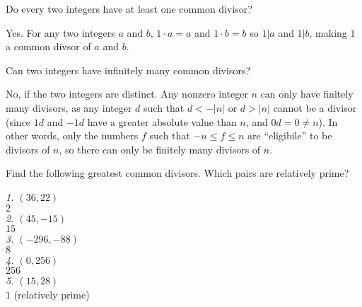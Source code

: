 \documentclass[../main.tex]{subfiles}
\begin{document}
\begin{ques} \label{1.29}
  Do every two integers have at least one common divisor?
\end{ques}

Yes. For any two integers $a$ and $b$, $1 \cdot a = a$ and $1 \cdot b = b$ so $1 | a$ and $1 | b$, making $1$ a common divsor of $a$ and $b$.



\begin{ques} \label{1.30}
  Can two integers have infinitely many common divisors?
\end{ques}

No, if the two integers are distinct. Any nonzero integer $n$ can only have finitely many divisors, as any integer $d$ such that $d < -|n|$ or $d > |n|$ cannot be a divisor (since $1d$ and $-1d$ have a greater absolute value than $n$, and $0d = 0 \neq n$). In other words, only the numbers $f$ such that $-n \leq f \leq n$ are ``eligibile'' to be divisors of $n$, so there can only be finitely many divisors of $n$.



\begin{ex} \label{1.31}
  Find the following greatest common divisors. Which pairs are relatively prime?
\end{ex}

\hspace*{5mm} \emph{1. $(36, 22)$} \\
\hspace*{15mm} $2$ \\

\hspace*{5mm} \emph{2. $(45, -15)$} \\
\hspace*{15mm} $15$ \\

\hspace*{5mm} \emph{3. $(-296, -88)$} \\
\hspace*{15mm} $8$ \\

\hspace*{5mm} \emph{4. $(0, 256)$} \\
\hspace*{15mm} $256$ \\

\hspace*{5mm} \emph{5. $(15, 28)$} \\
\hspace*{15mm} $1$ (relatively prime) \\
\end{document}
